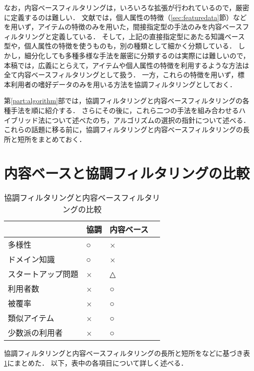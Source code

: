 なお，内容ベースフィルタリングは，いろいろな拡張が行われているので，厳密に定義するのは難しい．
文献\cite{ej:048}では，個人属性の特徴（\ref{sec:featuredata}節）などを用いず，アイテムの特徴のみを用いた，間接指定型の手法のみを内容ベースフィルタリングと定義している．
そして，上記の直接指定型にあたる知識ベース型や，個人属性の特徴を使うものも，別の種類として細かく分類している．
しかし，細分化しても多種多様な手法を厳密に分類するのは実際には難しいので，本稿では，広義にとらえて，アイテムや個人属性の特徴を利用するような方法は全て内容ベースフィルタリングとして扱う．
一方，これらの特徴を用いず，標本利用者の嗜好データのみを用いる方法を協調フィルタリングとしておく．

第\ref{part:algorithm}部では，協調フィルタリングと内容ベースフィルタリングの各種手法を順に紹介する．
さらにその後に，これら二つの手法を組み合わせるハイブリッド法について述べたのち，アルゴリズムの選択の指針について述べる．
これらの話題に移る前に，協調フィルタリングと内容ベースフィルタリングの長所と短所をまとめておく．

\section{内容ベースと協調フィルタリングの比較}
\label{sec:cfcbfcomp}

\begin{table}
\centering
\caption{協調フィルタリングと内容ベースフィルタリングの比較}
\label{tab:cfcbfcomp}
\begin{tabular}{l@{\qquad}>{\centering}p{}>{\centering}p{}p{0pt}}\toprule
 & 協調 & 内容ベース & \\\midrule
多様性 & ○ & × & \\
ドメイン知識 & ○ & × & \\
スタートアップ問題 & × & △ & \\
利用者数 & × & ○ & \\
被覆率 & × & ○ & \\
類似アイテム & × & ○ & \\
少数派の利用者 & × & ○ & \\
\bottomrule
\end{tabular}
\end{table}

協調フィルタリングと内容ベースフィルタリングの長所と短所を\cite{macm:97:02,ej:048}などに基づき表\ref{tab:cfcbfcomp}にまとめた．
以下，表中の各項目について詳しく述べる．

